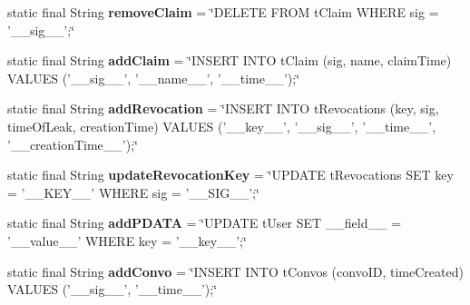 \begin{DoxyCompactItemize}
\item 
\hypertarget{classballmerpeak_1_1turtlenet_1_1server_1_1DBStrings_a01691bb9e0418b279a1eb0bcddb94b14}{static final String {\bfseries remove\-Claim} = \char`\"{}D\-E\-L\-E\-T\-E F\-R\-O\-M t\-Claim W\-H\-E\-R\-E sig = '\-\_\-\-\_\-sig\-\_\-\-\_\-';\char`\"{}}\label{classballmerpeak_1_1turtlenet_1_1server_1_1DBStrings_a01691bb9e0418b279a1eb0bcddb94b14}

\item 
\hypertarget{classballmerpeak_1_1turtlenet_1_1server_1_1DBStrings_a7622f836df4c75f736ae6b35eaa936a9}{static final String {\bfseries add\-Claim} = \char`\"{}I\-N\-S\-E\-R\-T I\-N\-T\-O t\-Claim (sig, name, claim\-Time) V\-A\-L\-U\-E\-S ('\-\_\-\-\_\-sig\-\_\-\-\_\-', '\-\_\-\-\_\-name\-\_\-\-\_\-', '\-\_\-\-\_\-time\-\_\-\-\_\-');\char`\"{}}\label{classballmerpeak_1_1turtlenet_1_1server_1_1DBStrings_a7622f836df4c75f736ae6b35eaa936a9}

\item 
\hypertarget{classballmerpeak_1_1turtlenet_1_1server_1_1DBStrings_a75d68f5b33bdd9fa483ebe6c4145b17e}{static final String {\bfseries add\-Revocation} = \char`\"{}I\-N\-S\-E\-R\-T I\-N\-T\-O t\-Revocations (key, sig, time\-Of\-Leak, creation\-Time) V\-A\-L\-U\-E\-S ('\-\_\-\-\_\-key\-\_\-\-\_\-', '\-\_\-\-\_\-sig\-\_\-\-\_\-', '\-\_\-\-\_\-time\-\_\-\-\_\-', '\-\_\-\-\_\-creation\-Time\-\_\-\-\_\-');\char`\"{}}\label{classballmerpeak_1_1turtlenet_1_1server_1_1DBStrings_a75d68f5b33bdd9fa483ebe6c4145b17e}

\item 
\hypertarget{classballmerpeak_1_1turtlenet_1_1server_1_1DBStrings_a39d82ab9d47622f3d106772a81171a1d}{static final String {\bfseries update\-Revocation\-Key} = \char`\"{}U\-P\-D\-A\-T\-E t\-Revocations S\-E\-T key = '\-\_\-\-\_\-\-K\-E\-Y\-\_\-\-\_\-' W\-H\-E\-R\-E sig = '\-\_\-\-\_\-\-S\-I\-G\-\_\-\-\_\-';\char`\"{}}\label{classballmerpeak_1_1turtlenet_1_1server_1_1DBStrings_a39d82ab9d47622f3d106772a81171a1d}

\item 
\hypertarget{classballmerpeak_1_1turtlenet_1_1server_1_1DBStrings_aac23d2b9eecb5d6088f8bb5058370c7b}{static final String {\bfseries add\-P\-D\-A\-T\-A} = \char`\"{}U\-P\-D\-A\-T\-E t\-User S\-E\-T \-\_\-\-\_\-field\-\_\-\-\_\- = '\-\_\-\-\_\-value\-\_\-\-\_\-' W\-H\-E\-R\-E key = '\-\_\-\-\_\-key\-\_\-\-\_\-';\char`\"{}}\label{classballmerpeak_1_1turtlenet_1_1server_1_1DBStrings_aac23d2b9eecb5d6088f8bb5058370c7b}

\item 
\hypertarget{classballmerpeak_1_1turtlenet_1_1server_1_1DBStrings_ac332d75426a3fc552c1492ca1c14701c}{static final String {\bfseries add\-Convo} = \char`\"{}I\-N\-S\-E\-R\-T I\-N\-T\-O t\-Convos (convo\-I\-D, time\-Created) V\-A\-L\-U\-E\-S ('\-\_\-\-\_\-sig\-\_\-\-\_\-', '\-\_\-\-\_\-time\-\_\-\-\_\-');\char`\"{}}\label{classballmerpeak_1_1turtlenet_1_1server_1_1DBStrings_ac332d75426a3fc552c1492ca1c14701c}


\end{DoxyCompactItemize}
